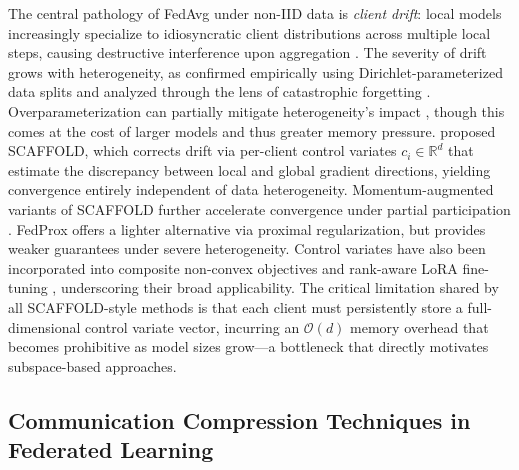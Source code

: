 \documentclass[11pt]{article}
\begin{document}
The central pathology of FedAvg under non-IID data is \emph{client drift}: local models increasingly specialize to idiosyncratic client distributions across multiple local steps, causing destructive interference upon aggregation \citep{karimireddy2020scaffold}. The severity of drift grows with heterogeneity, as confirmed empirically using Dirichlet-parameterized data splits \citep{reguieg2023comparative} and analyzed through the lens of catastrophic forgetting \citep{shoham2019overcoming}. Overparameterization can partially mitigate heterogeneity's impact \citep{jian2025widening}, though this comes at the cost of larger models and thus greater memory pressure. \citet{karimireddy2020scaffold} proposed SCAFFOLD, which corrects drift via per-client control variates $c_i \in \mathbb{R}^d$ that estimate the discrepancy between local and global gradient directions, yielding convergence entirely independent of data heterogeneity. Momentum-augmented variants of SCAFFOLD further accelerate convergence under partial participation \citep{Cheng2023MomentumBN}. FedProx \citep{su2023non} offers a lighter alternative via proximal regularization, but provides weaker guarantees under severe heterogeneity. Control variates have also been incorporated into composite non-convex objectives \citep{Zhou2025FedCanonNC} and rank-aware LoRA fine-tuning \citep{Zhou2025ILoRAFL}, underscoring their broad applicability. The critical limitation shared by all SCAFFOLD-style methods is that each client must persistently store a full-dimensional control variate vector, incurring an $\mathcal{O}(d)$ memory overhead that becomes prohibitive as model sizes grow---a bottleneck that directly motivates subspace-based approaches.

\subsection{Communication Compression Techniques in Federated Learning}
\end{document}
